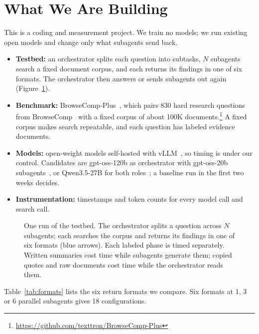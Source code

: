 \documentclass[11pt]{article}
\begin{document}
\section{What We Are Building}
This is a coding and measurement project. We train no models; we run existing open models and change only what subagents send back.
\begin{itemize}
  \item \textbf{Testbed:} an orchestrator splits each question into subtasks, $N$ subagents search a fixed document corpus, and each returns its findings in one of six formats. The orchestrator then answers or sends subagents out again (Figure~\ref{fig:system}).
  \item \textbf{Benchmark:} BrowseComp-Plus~\citep{chen2025browsecompplus}, which pairs 830 hard research questions from BrowseComp~\citep{openai2025browsecomp} with a fixed corpus of about 100K documents.\footnote{\url{https://github.com/texttron/BrowseComp-Plus}} A fixed corpus makes search repeatable, and each question has labeled evidence documents.
  \item \textbf{Models:} open-weight models self-hosted with vLLM~\citep{kwon2023vllm}, so timing is under our control. Candidates are gpt-oss-120b as orchestrator with gpt-oss-20b subagents~\citep{openai2025gptoss}, or Qwen3.5-27B for both roles~\citep{qwen2026qwen35}; a baseline run in the first two weeks decides.
  \item \textbf{Instrumentation:} timestamps and token counts for every model call and search call.
\end{itemize}

\begin{figure}[!htbp]
  \centering
  \resizebox{\linewidth}{!}{}
  \caption{One run of the testbed. The orchestrator splits a question across $N$ subagents; each searches the corpus and returns its findings in one of six formats (blue arrows). Each labeled phase is timed separately. Written summaries cost time while subagents generate them; copied quotes and raw documents cost time while the orchestrator reads them.}
  \label{fig:system}
\end{figure}

Table~\ref{tab:formats} lists the six return formats we compare. Six formats at 1, 3 or 6 parallel subagents gives 18 configurations.
\end{document}
